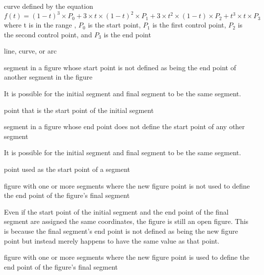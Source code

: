  curve defined by the 
equation $f(t) = (1 - t)^{3} \times P_{0} + 3 \times t \times (1 - t)^{2} 
\times P_{1} + 3 \times t^{2} \times (1 - t) \times P_{2} + t^{3} \times t 
\times P_{3}$ where t is in the range , $P_{0}$ is the start point, $P_{1}$ is the first control point, $P_{2}$ is the second control point, and $P_{3}$ is the end point

%
line, \bezierlocal curve, or arc

%
segment in a figure whose start point is not defined as being the end point of another segment in the figure
\begin{note}
It is possible for the initial segment and final segment to be the same segment.
\end{note}

%
point that is the start point of the initial segment

%
segment in a figure whose end point does not define the start point of any other segment
\begin{note}
It is possible for the initial segment and final segment to be the same segment.
\end{note}

%
point used as the start point of a segment

%
figure with one or more segments where the new figure point is not used to define the end point of the figure's final segment
\begin{note}
Even if the start point of the initial segment and the end point of the final segment are assigned the same coordinates, the figure is still an open figure. This is because the final segment's end point is not defined as being the new figure point but instead merely happens to have the same value as that point.
\end{note}

%
figure with one or more segments where the new figure point is used to define the end point of the figure's final segment

